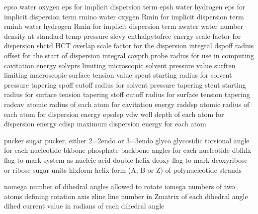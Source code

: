 \documentclass[letterpaper,11pt,english]{sphinxmanual}
\begin{document}
\sphinxAtStartPar
{}

\begin{sphinxVerbatim}[commandchars=\\\{\}]
epso            water oxygen eps for implicit dispersion term
epsh            water hydrogen eps for implicit dispersion term
rmino           water oxygen Rmin for implicit dispersion term
rminh           water hydrogen Rmin for implicit dispersion term
awater          water number density at standard temp \PYGZam{} pressure
slevy           enthalpy\PYGZhy{}to\PYGZhy{}free energy scale factor for dispersion
shctd           HCT overlap scale factor for the dispersion integral
dspoff          radius offset for the start of dispersion integral
cavprb          probe radius for use in computing cavitation energy
solvprs         limiting microscopic solvent pressure value
surften         limiting macroscopic surface tension value
spcut           starting radius for solvent pressure tapering
spoff           cutoff radius for solvent pressure tapering
stcut           starting radius for surface tension tapering
stoff           cutoff radius for surface tension tapering
radcav          atomic radius of each atom for cavitation energy
raddsp          atomic radius of each atom for dispersion energy
epsdsp          vdw well depth of each atom for dispersion energy
cdisp           maximum dispersion energy for each atom
\end{sphinxVerbatim}

\sphinxAtStartPar
{}

\begin{sphinxVerbatim}[commandchars=\\\{\}]
pucker          sugar pucker, either 2=2\PYGZsq{}\PYGZhy{}endo or 3=3\PYGZsq{}\PYGZhy{}endo
glyco           glycosidic torsional angle for each nucleotide
bkbone          phosphate backbone angles for each nucleotide
dblhlx          flag to mark system as nucleic acid double helix
deoxy           flag to mark deoxyribose or ribose sugar units
hlxform         helix form (A, B or Z) of polynucleotide strands
\end{sphinxVerbatim}

\sphinxAtStartPar
{}

\begin{sphinxVerbatim}[commandchars=\\\{\}]
nomega          number of dihedral angles allowed to rotate
iomega          numbers of two atoms defining rotation axis
zline           line number in Z\PYGZhy{}matrix of each dihedral angle
dihed           current value in radians of each dihedral angle
\end{sphinxVerbatim}
\end{document}
